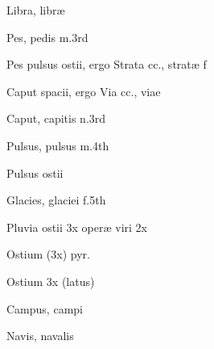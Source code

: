  {\mktsStyleItalic{}Libra\/}, libræ


 {\mktsStyleItalic{}Pes\/}, pedis {\mktsStyleItalic{}m.3rd\/}


 {\mktsStyleItalic{}Pes pulsus ostii\/}, ergo {\mktsStyleItalic{}Strata cc.\/}, stratæ {\mktsStyleItalic{}f\/}


 {\mktsStyleItalic{}Caput spacii\/}, ergo {\mktsStyleItalic{}Via cc.\/}, viae


 {\mktsStyleItalic{}Caput\/}, capitis {\mktsStyleItalic{}n.3rd\/}


 {\mktsStyleItalic{}Pulsus\/}, pulsus {\mktsStyleItalic{}m.4th\/}


	{\mktsStyleItalic{}Pulsus ostii\/}




 {\mktsStyleItalic{}Glacies\/}, glaciei {\mktsStyleItalic{}f.5th\/}


 {\mktsStyleItalic{}Pluvia ostii 3x operæ viri 2x\/}


	{\mktsStyleItalic{}Ostium (3x) pyr.\/}


 {\mktsStyleItalic{}Ostium 3x (latus)\/}


 {\mktsStyleItalic{}Campus\/}, campi


 {\mktsStyleItalic{}Navis\/}, navalis


